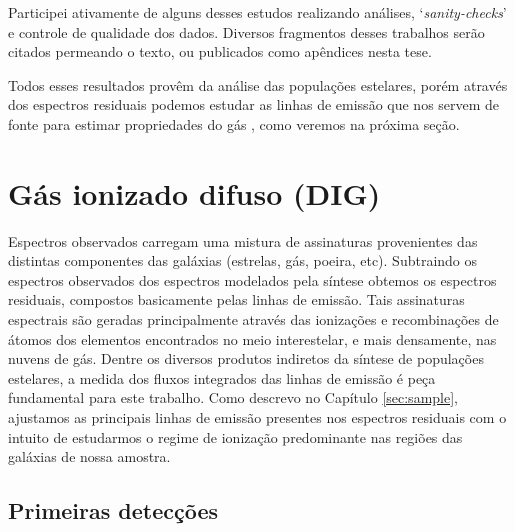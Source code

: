 Participei ativamente de alguns desses estudos realizando análises, `{\em sanity-checks}' e controle de qualidade dos dados. Diversos fragmentos desses trabalhos serão citados permeando o texto, ou publicados como apêndices nesta tese.

Todos esses resultados provêm da análise das populações estelares, porém através dos espectros residuais
podemos estudar as linhas de emissão que nos servem de fonte para estimar propriedades do gás \citep{Asari.etal.2007a}, como veremos na próxima seção.


\section{Gás ionizado difuso (DIG)}
\label{sec:intro:DIG}

Espectros observados carregam uma mistura de assinaturas provenientes das distintas componentes das galáxias (estrelas, gás, poeira, etc). Subtraindo os espectros observados dos espectros modelados pela síntese obtemos os espectros residuais, compostos basicamente pelas linhas de emissão. Tais assinaturas espectrais são geradas principalmente através das ionizações e recombinações de átomos dos elementos encontrados no meio interestelar, e mais densamente, nas nuvens de gás. Dentre os diversos produtos indiretos da síntese de populações estelares, a medida dos fluxos integrados das linhas de emissão é peça fundamental para este trabalho.
Como descrevo no Capítulo \ref{sec:sample}, ajustamos as principais linhas de emissão presentes nos espectros residuais com o intuito de estudarmos o regime de ionização predominante nas regiões das galáxias de nossa amostra.

\subsection{Primeiras detecções}
\label{sec:intro:DIG:first}

